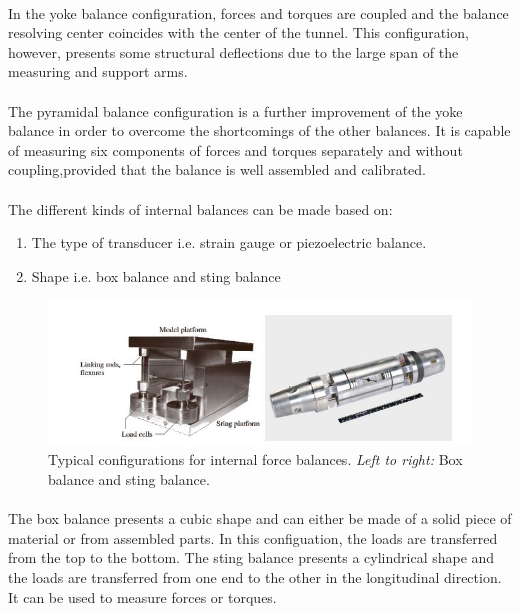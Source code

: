 \paragraph{}In the yoke balance configuration, forces and torques are coupled and the balance resolving center coincides with the center of the tunnel. This configuration, however, presents some structural deflections due to the large span of the measuring and support arms.
\paragraph{}The pyramidal balance configuration is a further improvement of the yoke balance in order to overcome the shortcomings of the other balances. It is capable of measuring six components of forces and
torques separately and without coupling,provided that the balance is well assembled and calibrated.

\paragraph{}The different kinds of internal balances can be made based on:
\begin{enumerate}
\item The type of transducer i.e. strain gauge or piezoelectric balance.
\item Shape i.e. box balance and sting balance
\end{enumerate} 
\begin{center}
	\begin{figure}[!h]
	\centering
	\includegraphics{Figures/Fig7}
	\caption{Typical configurations for internal force balances. \textit{Left to right:} Box balance and sting balance.}
	\end{figure}
\end{center}
\paragraph{}The box balance presents a cubic shape and can either be made of a solid piece of material or from assembled parts. In this configuation, the loads are transferred from the top to the bottom. The sting balance presents a cylindrical shape and the loads are transferred from one end to the other in the longitudinal direction. It can be used to measure forces or torques.

